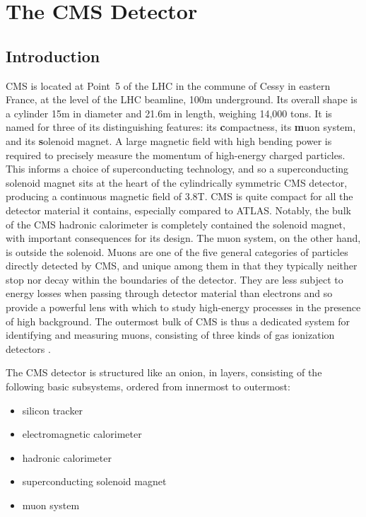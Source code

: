\section{The CMS Detector}
\subsection{Introduction}
\label{cms:intro}
CMS is located at Point~5 of the LHC in the commune of Cessy in eastern France, at the level of the LHC beamline, 100\unit{m} underground.
Its overall shape is a cylinder 15\unit{m} in diameter and 21.6\unit{m} in length, weighing 14,000 tons.
It is named for three of its distinguishing features: its \textbf{c}ompactness, its \textbf{m}uon system, and its \textbf{s}olenoid magnet.
A large magnetic field with high bending power is required to precisely measure the momentum of high-energy charged particles.
This informs a choice of superconducting technology, and so a superconducting solenoid magnet sits at the heart of the cylindrically symmetric CMS detector, producing a continuous magnetic field of 3.8\unit{T}.
CMS is quite compact for all the detector material it contains, especially compared to ATLAS.
Notably, the bulk of the CMS hadronic calorimeter is completely contained the solenoid magnet, with important consequences for its design.
The muon system, on the other hand, is outside the solenoid.
Muons are one of the five general categories of particles directly detected by CMS, and unique among them in that they typically neither stop nor decay within the boundaries of the detector.
They are less subject to energy losses when passing through detector material than electrons and so provide a powerful lens with which to study high-energy processes in the presence of high background.
The outermost bulk of CMS is thus a dedicated system for identifying and measuring muons, consisting of three kinds of gas ionization detectors \cite{Chatrchyan:2008zzk}.

The CMS detector is structured like an onion, in layers, consisting of the following basic subsystems, ordered from innermost to outermost:
\begin{itemize}
  \item silicon tracker
  \item electromagnetic calorimeter
  \item hadronic calorimeter
  \item superconducting solenoid magnet
  \item muon system
\end{itemize}

